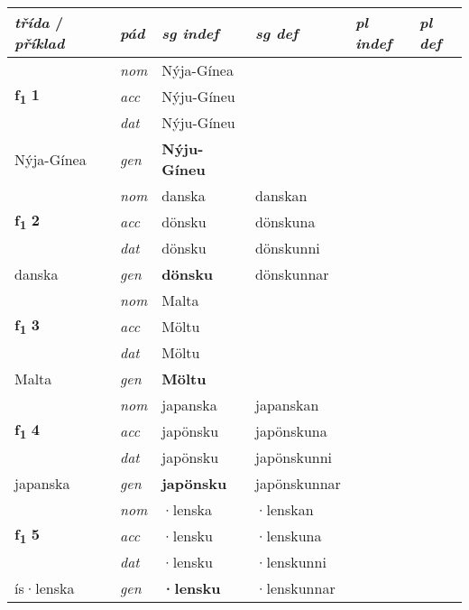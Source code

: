 \begin{longtable}[l]{X>{\footnotesize\itshape}XXXXX}
\toprule
{\textbf{\textit{třída}} / \textit{příklad}} & {\textit{pád}} & {\textit{sg indef}} & {\textit{sg def}} & {\textit{pl indef}} & {\textit{pl def}}\\
\midrule
\endhead
\multirow{3}{*}{{{\textbf{f{\textsubscript{1}}} \Large{\textbf{1}}}}} & nom & Nýja-Gínea &  & \textbf{} &  \\*
 & acc & Nýju-Gíneu &  &  &  \\*
 & dat & Nýju-Gíneu &  &  &  \\*
 {\footnotesize{Nýja-Gínea}} & gen & \textbf{Nýju-Gíneu} &  &  &  \\
\midrule

\multirow{3}{*}{{{\textbf{f{\textsubscript{1}}} \Large{\textbf{2}}}}} & nom & danska & danskan & \textbf{} &  \\*
 & acc & dönsku & dönskuna &  &  \\*
 & dat & dönsku & dönskunni &  &  \\*
 {\footnotesize{danska}} & gen & \textbf{dönsku} & dönskunnar &  &  \\
\midrule

\multirow{3}{*}{{{\textbf{f{\textsubscript{1}}} \Large{\textbf{3}}}}} & nom & Malta &  & \textbf{} &  \\*
 & acc & Möltu &  &  &  \\*
 & dat & Möltu &  &  &  \\*
 {\footnotesize{Malta}} & gen & \textbf{Möltu} &  &  &  \\
\midrule

\multirow{3}{*}{{{\textbf{f{\textsubscript{1}}} \Large{\textbf{4}}}}} & nom & japanska & japanskan & \textbf{} &  \\*
 & acc & japönsku & japönskuna &  &  \\*
 & dat & japönsku & japönskunni &  &  \\*
 {\footnotesize{japanska}} & gen & \textbf{japönsku} & japönskunnar &  &  \\
\midrule

\multirow{3}{*}{{{\textbf{f{\textsubscript{1}}} \Large{\textbf{5}}}}} & nom & ·lenska & ·lenskan & \textbf{} &  \\*
 & acc & ·lensku & ·lenskuna &  &  \\*
 & dat & ·lensku & ·lenskunni &  &  \\*
 {\footnotesize{ís\allowbreak ·lenska}} & gen & \textbf{·lensku} & ·lenskunnar &  &  \\
\midrule


\end{longtable}
